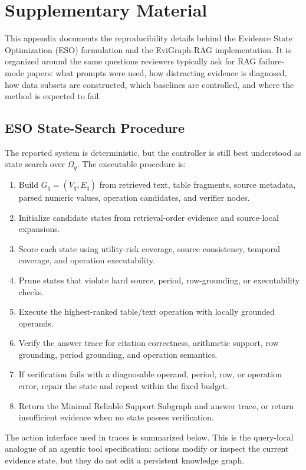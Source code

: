 \section{Supplementary Material}

This appendix documents the reproducibility details behind the Evidence State
Optimization (ESO) formulation and the EviGraph-RAG implementation.  It is
organized around the same questions reviewers typically ask for RAG failure-mode
papers: what prompts were used, how distracting evidence is diagnosed, how data
subsets are constructed, which baselines are controlled, and where the method is
expected to fail.

\subsection{ESO State-Search Procedure}

The reported system is deterministic, but the controller is still best
understood as state search over \(\Omega_q\).  The executable procedure is:
\begin{enumerate}
    \item Build \(G_q=(V_q,E_q)\) from retrieved text, table fragments, source
    metadata, parsed numeric values, operation candidates, and verifier nodes.
    \item Initialize candidate states from retrieval-order evidence and
    source-local expansions.
    \item Score each state using utility-risk coverage, source consistency,
    temporal coverage, and operation executability.
    \item Prune states that violate hard source, period, row-grounding, or
    executability checks.
    \item Execute the highest-ranked table/text operation with locally grounded
    operands.
    \item Verify the answer trace for citation correctness, arithmetic support,
    row grounding, period grounding, and operation semantics.
    \item If verification fails with a diagnosable operand, period, row, or
    operation error, repair the state and repeat within the fixed budget.
    \item Return the Minimal Reliable Support Subgraph and answer trace, or
    return insufficient evidence when no state passes verification.
\end{enumerate}

The action interface used in traces is summarized below.  This is the
query-local analogue of an agentic tool specification: actions modify or inspect
the current evidence state, but they do not edit a persistent knowledge graph.

